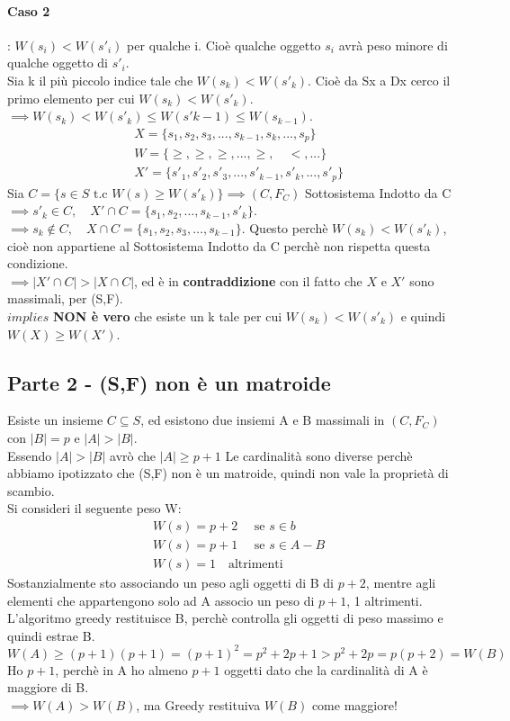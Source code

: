 \paragraph*{Caso 2}: $W(s_i) < W(s'_i)$ per qualche i. Cioè qualche oggetto $s_i$ avrà peso minore di qualche oggetto
di $s'_i$.\\
Sia k il più piccolo indice tale che $W(s_k) < W(s'_k)$. Cioè da Sx a Dx cerco il primo elemento per cui $W(s_k) < W(s'_k)$.\\
$\implies W(s_k) < W(s'_k) \leq W(s'{k-1}) \leq W(s_{k-1})$.
\begin{align*}
    &X = \{s_1, s_2, s_3, ..., s_{k-1}, s_k, ..., s_p\}\\
    &W = \{ \geq, \geq, \geq, ..., \geq,\quad <, ...\}\\
    &X'= \{s'_1, s'_2, s'_3, ..., s'_{k-1}, s'_k, ..., s'_p\}
\end{align*}
Sia $C = \{s \in S \text{ t.c } W(s) \geq W(s'_k)\} \implies (C, F_C)$ Sottosistema Indotto da C\\
$\implies s'_k \in C, \quad X' \cap C = \{s_1, s_2, \dots, s_{k-1}, s'_k\}$.\\
$\implies s_k \notin C, \quad X \cap C = \{s_1, s_2, s_3, \dots, s_{k-1}\}$. 
Questo perchè $W(s_k) < W(s'_k)$, cioè non appartiene al Sottosistema Indotto da C perchè
non rispetta questa condizione.\\
$\implies |X' \cap C| > |X \cap C|$, ed è in \textbf{contraddizione} con il fatto che $X$ e $X'$ sono massimali,
per (S,F).\\
$implies$ \textbf{NON è vero} che esiste un k tale per cui $W(s_k) < W(s'_k)$ e quindi $W(X) \geq W(X')$.
\subsection{Parte 2 - (S,F) non è un matroide}
Esiste un insieme $C \subseteq S$, ed esistono due insiemi A e B massimali in $(C, F_C)$ con $|B|=p$ e $|A| > |B|$.\\
Essendo $|A| > |B|$ avrò che $|A| \geq p+1$ 
Le cardinalità sono diverse perchè abbiamo ipotizzato che (S,F) non è un matroide, quindi non vale la proprietà di scambio.\\
Si consideri il seguente peso W:
\begin{align*}
    &W(s) = p+2 \quad \text{ se } s \in b\\
    &W(s) = p+1 \quad \text{ se } s \in A-B\\
    &W(s) = 1 \quad \text{altrimenti}
\end{align*}
Sostanzialmente sto associando un peso agli oggetti di B di $p+2$, mentre agli elementi che appartengono solo ad A associo
un peso di $p+1$, 1 altrimenti.\\
L'algoritmo greedy restituisce B, perchè controlla gli oggetti di peso massimo e quindi estrae B.\\
$W(A) \geq (p+1)(p+1) = (p+1)^2 = p^2 + 2p + 1 > p^2 + 2p = p(p+2) = W(B)$\\
Ho $p+1$, perchè in A ho almeno $p+1$ oggetti dato che la cardinalità di A è maggiore di B.\\
$\implies W(A) > W(B)$, ma Greedy restituiva $W(B)$ come maggiore!\\
